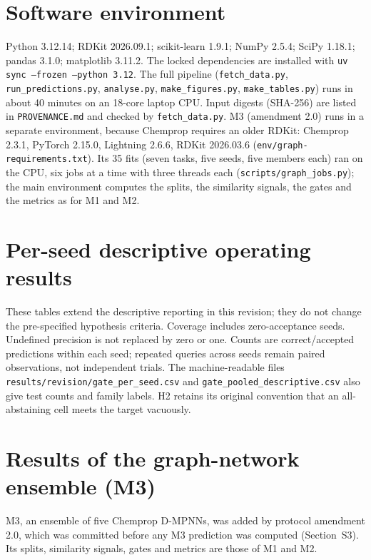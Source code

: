 \documentclass[11pt,letterpaper]{article}
\begin{document}
\begingroup\small\raggedright

\endgroup

\section{Software environment}

Python 3.12.14; RDKit 2026.09.1; scikit-learn 1.9.1; NumPy 2.5.4; SciPy 1.18.1; pandas 3.1.0; matplotlib 3.11.2. The locked dependencies are installed with \texttt{uv sync --frozen --python 3.12}. The full pipeline (\texttt{fetch\_data.py}, \texttt{run\_predictions.py}, \texttt{analyse.py}, \texttt{make\_figures.py}, \texttt{make\_tables.py}) runs in about 40 minutes on an 18-core laptop CPU. Input digests (SHA-256) are listed in \texttt{PROVENANCE.md} and checked by \texttt{fetch\_data.py}. M3 (amendment 2.0) runs in a separate environment, because Chemprop requires an older RDKit: Chemprop 2.3.1, PyTorch 2.15.0, Lightning 2.6.6, RDKit 2026.03.6 (\texttt{env/graph-requirements.txt}). Its 35 fits (seven tasks, five seeds, five members each) ran on the CPU, six jobs at a time with three threads each (\texttt{scripts/graph\_jobs.py}); the main environment computes the splits, the similarity signals, the gates and the metrics as for M1 and M2.

\clearpage
\section{Per-seed descriptive operating results}
These tables extend the descriptive reporting in this revision; they do not change the pre-specified hypothesis criteria. Coverage includes zero-acceptance seeds. Undefined precision is not replaced by zero or one. Counts are correct/accepted predictions within each seed; repeated queries across seeds remain paired observations, not independent trials. The machine-readable files \texttt{results/revision/gate\_per\_seed.csv} and \texttt{gate\_pooled\_descriptive.csv} also give test counts and family labels. H2 retains its original convention that an all-abstaining cell meets the target vacuously.

\begingroup\scriptsize

\clearpage

\clearpage

\clearpage

\clearpage

\clearpage

\endgroup

\clearpage
\section{Results of the graph-network ensemble (M3)}
M3, an ensemble of five Chemprop D-MPNNs, was added by protocol amendment 2.0, which was committed before any M3 prediction was computed (Section~S3). Its splits, similarity signals, gates and metrics are those of M1 and M2.
\end{document}
